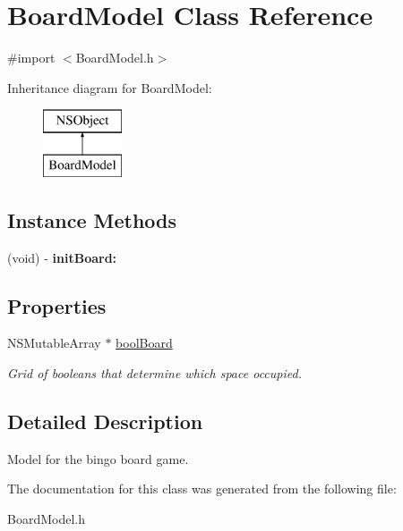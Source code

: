 \hypertarget{interface_board_model}{\section{Board\+Model Class Reference}
\label{interface_board_model}
}


{\ttfamily \#import $<$Board\+Model.\+h$>$}

Inheritance diagram for Board\+Model\+:\begin{figure}[H]
\begin{center}
\leavevmode
\includegraphics[height=2.000000cm]{interface_board_model}
\end{center}
\end{figure}
\subsection*{Instance Methods}
\begin{DoxyCompactItemize}
\item 
\hypertarget{interface_board_model_addf7a9b92a88b8f907e75494ead7d552}{(void) -\/ {\bfseries init\+Board\+:}}\label{interface_board_model_addf7a9b92a88b8f907e75494ead7d552}

\end{DoxyCompactItemize}
\subsection*{Properties}
\begin{DoxyCompactItemize}
\item 
\hypertarget{interface_board_model_a7c63e201829243984f5b4356d76259be}{N\+S\+Mutable\+Array $\ast$ \hyperlink{interface_board_model_a7c63e201829243984f5b4356d76259be}{bool\+Board}}\label{interface_board_model_a7c63e201829243984f5b4356d76259be}

\begin{DoxyCompactList}\small\item\em Grid of booleans that determine which space occupied. \end{DoxyCompactList}\end{DoxyCompactItemize}


\subsection{Detailed Description}
Model for the bingo board game. 

The documentation for this class was generated from the following file\+:\begin{DoxyCompactItemize}
\item 
Board\+Model.\+h\end{DoxyCompactItemize}
